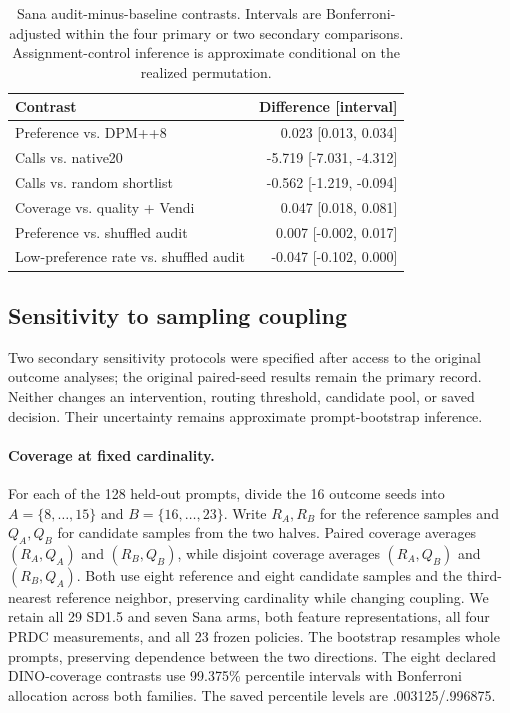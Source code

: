 \begin{table}[t]\centering\small
\caption{Sana audit-minus-baseline contrasts. Intervals are Bonferroni-adjusted within the four primary or two secondary comparisons. Assignment-control inference is approximate conditional on the realized permutation.}
\begin{tabular}{p{}r}\toprule
Contrast & Difference [interval] \\\midrule
Preference vs. DPM++8 & 0.023 [0.013, 0.034] \\
Calls vs. native20 & -5.719 [-7.031, -4.312] \\
Calls vs. random shortlist & -0.562 [-1.219, -0.094] \\
Coverage vs. quality + Vendi & 0.047 [0.018, 0.081] \\
\midrule
Preference vs. shuffled audit & 0.007 [-0.002, 0.017] \\
Low-preference rate vs. shuffled audit & -0.047 [-0.102, 0.000] \\
\bottomrule\end{tabular}\end{table}



\subsection{Sensitivity to sampling coupling}
\label{sec:t2i-coupling-sensitivity}
Two secondary sensitivity protocols were specified after access to the original outcome analyses; the original paired-seed results remain the primary record. Neither changes an intervention, routing threshold, candidate pool, or saved decision. Their uncertainty remains approximate prompt-bootstrap inference.

\paragraph{Coverage at fixed cardinality.}
For each of the 128 held-out prompts, divide the 16 outcome seeds into
$A=\{8,\ldots,15\}$ and $B=\{16,\ldots,23\}$.
Write $R_A,R_B$ for the reference samples and $Q_A,Q_B$ for candidate
samples from the two halves. Paired coverage averages $(R_A,Q_A)$ and
$(R_B,Q_B)$, while disjoint coverage averages $(R_A,Q_B)$ and $(R_B,Q_A)$.
Both use eight reference and eight candidate samples and the third-nearest
reference neighbor, preserving cardinality while changing coupling.
We retain all 29 SD1.5 and seven Sana arms, both feature representations,
all four PRDC measurements, and all 23 frozen policies. The bootstrap
resamples whole prompts, preserving dependence between the two directions.
The eight declared DINO-coverage contrasts use 99.375\% percentile
intervals with Bonferroni allocation across both families. The saved
percentile levels are .003125/.996875.

